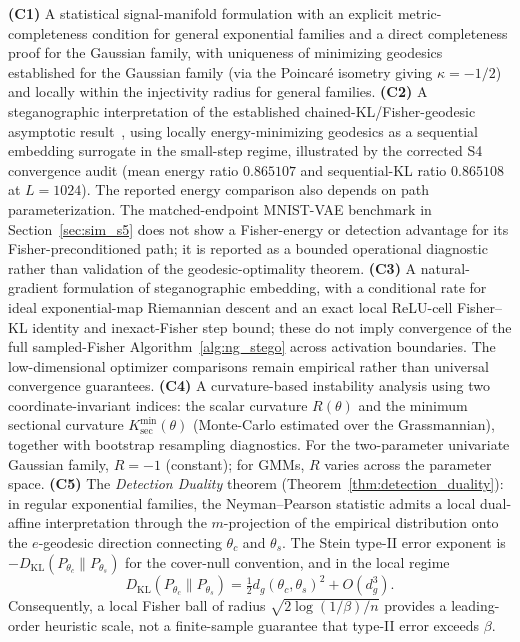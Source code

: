 \documentclass[a4paper,fleqn]{cas-dc}
\begin{document}
\textbf{(C1)} A statistical signal-manifold formulation with an explicit metric-completeness condition for general exponential
families and a direct completeness proof for the Gaussian family,
with uniqueness of minimizing geodesics established for the Gaussian
family (via the Poincar\'e isometry giving $\kappa=-1/2$) and locally
within the injectivity radius for general families.
\textbf{(C2)} A steganographic interpretation of the established
chained-KL/Fisher-geodesic asymptotic result~\cite{pavlichin2016chained},
using locally energy-minimizing geodesics as a sequential embedding surrogate
in the small-step regime, illustrated by the corrected S4 convergence audit (mean energy ratio $0.865107$ and sequential-KL ratio $0.865108$ at $L=1024$). The reported energy comparison also depends on path parameterization. The matched-endpoint MNIST-VAE benchmark in
Section~\ref{sec:sim_s5} does not show a Fisher-energy or detection advantage
for its Fisher-preconditioned path; it is reported as a bounded operational
diagnostic rather than validation of the geodesic-optimality theorem.
\textbf{(C3)} A natural-gradient formulation of steganographic embedding,
with a conditional rate for ideal exponential-map Riemannian descent and
an exact local ReLU-cell Fisher--KL identity and inexact-Fisher step bound;
these do not imply convergence of the full sampled-Fisher Algorithm~\ref{alg:ng_stego}
across activation boundaries. The low-dimensional optimizer comparisons
remain empirical rather than universal convergence guarantees.
\textbf{(C4)} A curvature-based instability analysis using two
coordinate-invariant indices: the scalar curvature $R(\theta)$ and the
minimum sectional curvature $K_{\sec}^{\min}(\theta)$ (Monte-Carlo
estimated over the Grassmannian), together with bootstrap resampling diagnostics.
For the two-parameter univariate Gaussian family, $R = -1$ (constant); for GMMs, $R$ varies
across the parameter space.
\textbf{(C5)} The \emph{Detection Duality} theorem
(Theorem~\ref{thm:detection_duality}): in regular exponential families,
the Neyman--Pearson statistic admits a local dual-affine interpretation
through the $m$-projection of the empirical distribution onto the
$e$-geodesic direction connecting $\theta_c$ and $\theta_s$.
The Stein type-II error exponent is
$-D_{\mathrm{KL}}(P_{\theta_c}\|P_{\theta_s})$ for the cover-null convention, and in the local regime
\[
D_{\mathrm{KL}}(P_{\theta_c}\|P_{\theta_s})
=
\tfrac{1}{2}d_g(\theta_c,\theta_s)^2 + O(d_g^3).
\]
Consequently, a local Fisher ball of radius
$\sqrt{2\log(1/\beta)/n}$ provides a leading-order heuristic scale, not a finite-sample
guarantee that type-II error exceeds $\beta$.
\end{document}
